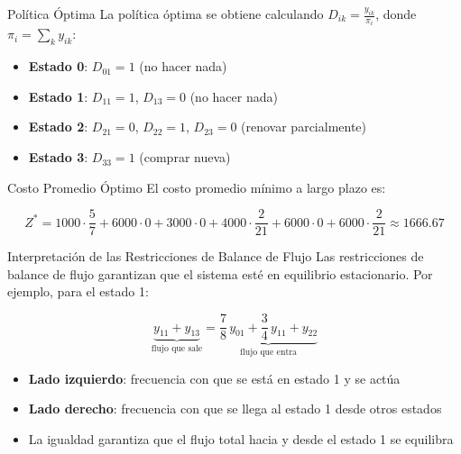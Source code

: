 \documentclass{beamer}
\begin{document}
\begin{frame}{Política Óptima}
    \small
    La política óptima se obtiene calculando $D_{ik} = \frac{y_{ik}}{\pi_i}$, donde $\pi_i = \sum_k y_{ik}$:

    \vspace{0.5em}

    \begin{itemize}
        \item \textbf{Estado 0}: $D_{01} = 1$ (no hacer nada)
        \item \textbf{Estado 1}: $D_{11} = 1$, $D_{13} = 0$ (no hacer nada)
        \item \textbf{Estado 2}: $D_{21} = 0$, $D_{22} = 1$, $D_{23} = 0$ (renovar parcialmente)
        \item \textbf{Estado 3}: $D_{33} = 1$ (comprar nueva)
    \end{itemize}
\end{frame}

\begin{frame}{Costo Promedio Óptimo}
    \small
    El costo promedio mínimo a largo plazo es:

    \[
    Z^* = 1000 \cdot \frac{5}{7} + 6000 \cdot 0 + 3000 \cdot 0 + 4000 \cdot \frac{2}{21} + 6000 \cdot 0 + 6000 \cdot \frac{2}{21} \approx 1666.67
    \]
\end{frame}

\begin{frame}{Interpretación de las Restricciones de Balance de Flujo}
    \small
    Las restricciones de balance de flujo garantizan que el sistema esté en equilibrio estacionario. Por ejemplo, para el estado 1:

    \[
    \underbrace{y_{11} + y_{13}}_{\text{flujo que sale}} = \underbrace{\frac{7}{8}\,y_{01} + \frac{3}{4}\,y_{11} + y_{22}}_{\text{flujo que entra}}
    \]

    \vspace{0.5em}

    \begin{itemize}
        \item \textbf{Lado izquierdo}: frecuencia con que se está en estado 1 y se actúa
        \item \textbf{Lado derecho}: frecuencia con que se llega al estado 1 desde otros estados
        \item La igualdad garantiza que el flujo total hacia y desde el estado 1 se equilibra
    \end{itemize}
\end{frame}
\end{document}
